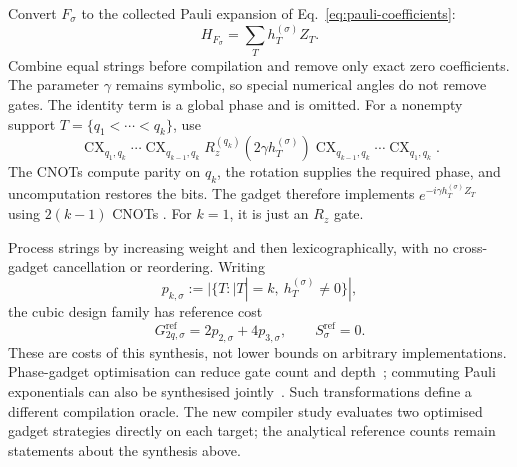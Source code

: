 \documentclass[a4paper,onecolumn,11pt,unpublished]{quantumarticle}
\theoremstyle{remark}
\begin{document}
Convert $F_\sigma$ to the collected Pauli expansion of
Eq.~\eqref{eq:pauli-coefficients}:
\begin{equation}
H_{F_\sigma}=\sum_T h_T^{(\sigma)}Z_T.
\label{eq:reference-collected-hamiltonian}
\end{equation}
Combine equal strings before compilation and remove only exact zero
coefficients.  The parameter $\gamma$ remains symbolic, so special numerical
angles do not remove gates.  The identity term is a global phase and is omitted.
For a nonempty support $T=\{q_1<\cdots<q_k\}$, use
\begin{equation}
\operatorname{CX}_{q_1,q_k}\cdots\operatorname{CX}_{q_{k-1},q_k}
R_z^{(q_k)}(2\gamma h_T^{(\sigma)})
\operatorname{CX}_{q_{k-1},q_k}\cdots\operatorname{CX}_{q_1,q_k}.
\label{eq:reference-parity-gadget}
\end{equation}
The CNOTs compute parity on $q_k$, the rotation supplies the required phase,
and uncomputation restores the bits.  The gadget therefore implements
$e^{-i\gamma h_T^{(\sigma)}Z_T}$ using $2(k-1)$ CNOTs
\cite{CampbellDahl2022,Verchere2023}.  For $k=1$, it is just an $R_z$ gate.

Process strings by increasing weight and then lexicographically, with no
cross-gadget cancellation or reordering.  Writing
\begin{equation}
p_{k,\sigma}:=|\{T:|T|=k,\ h_T^{(\sigma)}\neq0\}|,
\label{eq:reference-pauli-count}
\end{equation}
the cubic design family has reference cost
\begin{equation}
G_{2q,\sigma}^{\mathrm{ref}}=2p_{2,\sigma}+4p_{3,\sigma},
\qquad S_\sigma^{\mathrm{ref}}=0.
\label{eq:reference-gate-count}
\end{equation}
These are costs of this synthesis, not lower bounds on arbitrary implementations.
Phase-gadget optimisation can reduce gate count and depth~\cite{CowtanPhase2020};
commuting Pauli exponentials can also be synthesised jointly~\cite{CowtanUCC2020}.
Such transformations define a different compilation oracle. The new compiler
study evaluates two optimised gadget strategies directly on each target;
the analytical reference counts remain statements about the synthesis above.
\end{document}
